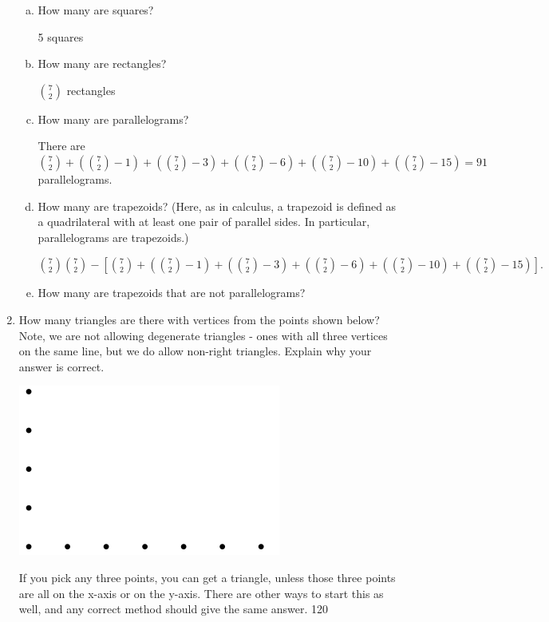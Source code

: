 \documentclass[11pt, a4paper]{article}
\begin{document}
\begin{enumerate}
\begin{enumerate}[(a)]
                \item How many are squares?

                5 squares

                \item How many are rectangles?

                ${7\choose 2}$ rectangles

                \item How many are parallelograms?

                There are ${7\choose 2} + ({7\choose 2} - 1) + ({7\choose 2} - 3) + ({7\choose 2} - 6) + ({7\choose 2} - 10) + ({7\choose 2} - 15) = 91$ parallelograms.

                \item How many are trapezoids? (Here, as in calculus, a trapezoid is defined as a quadrilateral with at least one pair of parallel sides. In particular, parallelograms are trapezoids.)

${7\choose 2}{7\choose 2} - \left[ {7 \choose 2} + ({7 \choose 2}-1) + ({7 \choose 2} - 3) + ({7 \choose 2} - 6) + ({7 \choose 2} - 10) + ({7 \choose 2} - 15) \right]\text{.}$

                \item How many are trapezoids that are not parallelograms?



            \end{enumerate}

        \item How many triangles are there with vertices from the points shown below? Note, we are not allowing degenerate triangles - ones with all three vertices on the same line, but we do allow non-right triangles. Explain why your answer is correct.

            \begin{center}
            \includegraphics[width=.5\textwidth]{hw4_graphic2}
            \end{center}

            If you pick any three points, you can get a triangle, unless those three points are all on the x-axis or on the y-axis. There are other ways to start this as well, and any correct method should give the same answer. 120


\end{enumerate}
\end{document}
